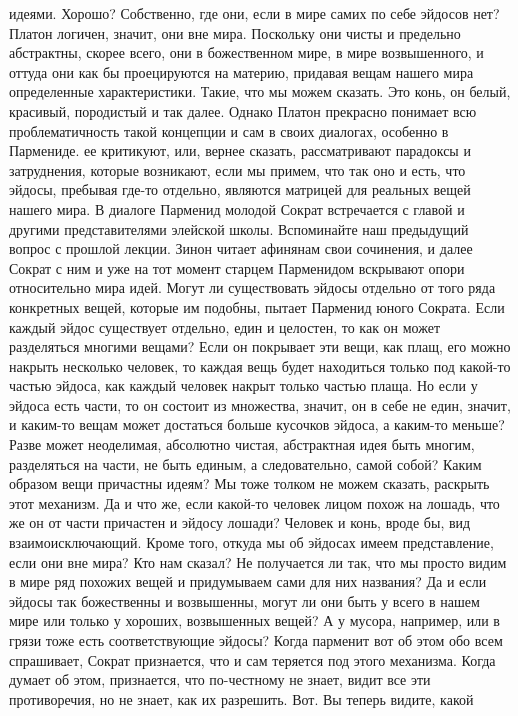 идеями. Хорошо? Собственно, где они, если в мире самих по себе эйдосов нет?
Платон логичен, значит, они вне мира. Поскольку они чисты и предельно
абстрактны, скорее всего, они в божественном мире, в мире возвышенного, и оттуда
они как бы проецируются на материю, придавая вещам нашего мира определенные
характеристики. Такие, что мы можем сказать. Это конь, он белый, красивый,
породистый и так далее. Однако Платон прекрасно понимает всю проблематичность
такой концепции и сам в своих диалогах, особенно в Пармениде. ее критикуют, или,
вернее сказать, рассматривают парадоксы и затруднения, которые возникают, если
мы примем, что так оно и есть, что эйдосы, пребывая где-то отдельно, являются
матрицей для реальных вещей нашего мира. В диалоге Парменид молодой Сократ
встречается с главой и другими представителями элейской школы. Вспоминайте наш
предыдущий вопрос с прошлой лекции. Зинон читает афинянам свои сочинения, и
далее Сократ с ним и уже на тот момент старцем Парменидом вскрывают опори
относительно мира идей. Могут ли существовать эйдосы отдельно от того ряда
конкретных вещей, которые им подобны, пытает Парменид юного Сократа. Если каждый
эйдос существует отдельно, един и целостен, то как он может разделяться многими
вещами? Если он покрывает эти вещи, как плащ, его можно накрыть несколько
человек, то каждая вещь будет находиться только под какой-то частью эйдоса, как
каждый человек накрыт только частью плаща. Но если у эйдоса есть части, то он
состоит из множества, значит, он в себе не един, значит, и каким-то вещам может
достаться больше кусочков эйдоса, а каким-то меньше? Разве может неоделимая,
абсолютно чистая, абстрактная идея быть многим, разделяться на части, не быть
единым, а следовательно, самой собой? Каким образом вещи причастны идеям? Мы
тоже толком не можем сказать, раскрыть этот механизм. Да и что же, если какой-то
человек лицом похож на лошадь, что же он от части причастен и эйдосу лошади?
Человек и конь, вроде бы, вид взаимоисключающий. Кроме того, откуда мы об
эйдосах имеем представление, если они вне мира? Кто нам сказал? Не получается ли
так, что мы просто видим в мире ряд похожих вещей и придумываем сами для них
названия? Да и если эйдосы так божественны и возвышенны, могут ли они быть у
всего в нашем мире или только у хороших, возвышенных вещей? А у мусора,
например, или в грязи тоже есть соответствующие эйдосы? Когда парменит вот об
этом обо всем спрашивает, Сократ признается, что и сам теряется под этого
механизма. Когда думает об этом, признается, что по-честному не знает, видит все
эти противоречия, но не знает, как их разрешить. Вот. Вы теперь видите, какой
